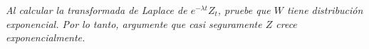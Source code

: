 \emph{
    Al calcular la transformada de Laplace de $e^{-\lambda t}Z_t$, pruebe que $W$ tiene 
    distribuci\'on exponencial. Por lo tanto, argumente que casi seguramente $Z$ crece exponencialmente.
    \pn
}
\afterstatement\pn